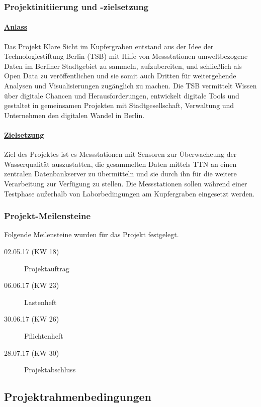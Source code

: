 \subsubsection{Projektinitiierung und -zielsetzung}

\paragraph{\uline{Anlass}}

Das Projekt \glqq Klare Sicht im Kupfergraben\grqq{} entstand aus der Idee der Technologiestiftung Berlin (TSB) mit Hilfe von Messstationen umweltbezogene Daten im Berliner Stadtgebiet zu sammeln, aufzubereiten, und schließlich als \glqq Open Data\grqq{} zu veröffentlichen und sie somit auch Dritten für weitergehende Analysen und Visualisierungen zugänglich zu machen.
Die TSB vermittelt Wissen über digitale Chancen und Herausforderungen, entwickelt digitale Tools und gestaltet in gemeinsamen Projekten mit Stadtgesellschaft, Verwaltung und Unternehmen den digitalen Wandel in Berlin.

\paragraph{\uline{Zielsetzung}}

Ziel des Projektes ist es Messstationen mit Sensoren zur Überwacheung der Wasserqualität auszustatten, die gesammelten Daten mittels TTN an einen zentralen Datenbankserver zu übermitteln und sie durch ihn für die weitere Verarbeitung zur Verfügung zu stellen. Die Messstationen sollen während einer Testphase außerhalb von Laborbedingungen am Kupfergraben eingesetzt werden.

\subsubsection{Projekt-Meilensteine}

Folgende Meilensteine wurden f\"ur das Projekt festgelegt.

\begin{description}
	\item[02.05.17 (KW 18)] Projektauftrag
	\item[06.06.17 (KW 23)] Lastenheft
	\item[30.06.17 (KW 26)] Pflichtenheft
	\item[28.07.17 (KW 30)] Projektabschluss
\end{description}

\subsection{Projektrahmenbedingungen}

